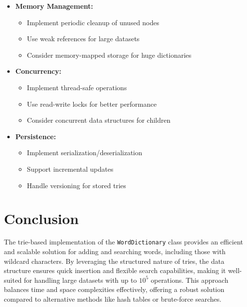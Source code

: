 \begin{itemize}
    \item \textbf{Memory Management:}
    \begin{itemize}
        \item Implement periodic cleanup of unused nodes
        \item Use weak references for large datasets
        \item Consider memory-mapped storage for huge dictionaries
    \end{itemize}

    \item \textbf{Concurrency:}
    \begin{itemize}
        \item Implement thread-safe operations
        \item Use read-write locks for better performance
        \item Consider concurrent data structures for children
    \end{itemize}

    \item \textbf{Persistence:}
    \begin{itemize}
        \item Implement serialization/deserialization
        \item Support incremental updates
        \item Handle versioning for stored tries
    \end{itemize}
\end{itemize}

\section*{Conclusion}

The trie-based implementation of the \texttt{WordDictionary} class provides an efficient and scalable solution for adding and searching words, including those with wildcard characters. By leveraging the structured nature of tries, the data structure ensures quick insertion and flexible search capabilities, making it well-suited for handling large datasets with up to \(10^5\) operations. This approach balances time and space complexities effectively, offering a robust solution compared to alternative methods like hash tables or brute-force searches.

\printindex